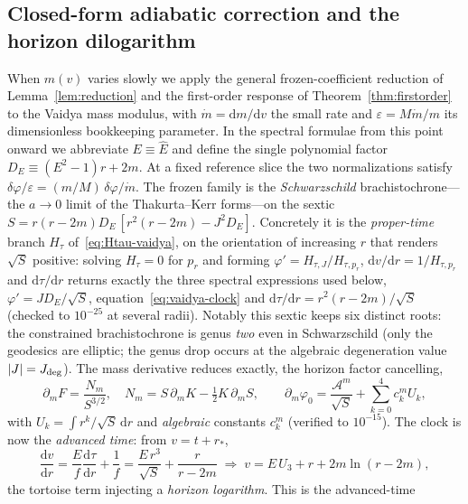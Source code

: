 \documentclass[12pt]{iopart}
\newcommand{\Ehat}{\hat E}
\newcommand{\dd}{\mathrm{d}}
\theoremstyle{plain}
\theoremstyle{definition}
\theoremstyle{plain}
\theoremstyle{remark}
\begin{document}
\subsection{Closed-form adiabatic correction and the horizon dilogarithm}
\label{sec:vaidya-adiabatic}
When $m(v)$ varies slowly we apply the general frozen-coefficient reduction of
Lemma~\ref{lem:reduction} and the first-order response of Theorem~\ref{thm:firstorder} to the Vaidya mass modulus, with
$\dot m=\dd m/\dd v$ the small rate and $\varepsilon=M\dot m/m$ its dimensionless
bookkeeping parameter. In the spectral formulae from this point onward we abbreviate
$E\equiv\Ehat$ and define the single polynomial factor
$D_E\equiv(E^2-1)r+2m$. At a fixed reference slice the two normalizations satisfy
$\delta\varphi/\varepsilon=(m/M)\,\delta\varphi/\dot m$. The frozen family
is the \emph{Schwarzschild} brachistochrone---the $a\to0$ limit of the
Thakurta--Kerr forms---on the sextic
$S=r(r-2m)D_E\,[r^2(r-2m)-J^2 D_E]$. Concretely it is the \emph{proper-time} branch
$H_\tau$ of~\eqref{eq:Htau-vaidya}, on the orientation of increasing $r$ that renders
$\sqrt S$ positive: solving $H_\tau=0$ for $p_r$ and forming
$\varphi'=H_{\tau,J}/H_{\tau,p_r}$, $\dd v/\dd r=1/H_{\tau,p_r}$ and $\dd\tau/\dd r$
returns exactly the three spectral expressions used below,
$\varphi'=J D_E/\sqrt S$, equation~\eqref{eq:vaidya-clock} and
$\dd\tau/\dd r=r^2(r-2m)/\sqrt S$ (checked to $10^{-25}$ at several radii). Notably this
sextic keeps six distinct roots: the constrained brachistochrone is genus \emph{two} even in
Schwarzschild (only the geodesics are elliptic; the genus drop occurs at the algebraic
degeneration value $|J|=J_{\rm deg}$). The mass derivative reduces exactly, the horizon factor cancelling,
\begin{equation}
    \partial_m F=\frac{N_m}{S^{3/2}},\quad N_m=S\,\partial_m K-\tfrac12 K\,\partial_m S,
    \qquad
    \partial_m\varphi_0=\frac{\mathcal{A}^m}{\sqrt S}+\sum_{k=0}^4 c_k^m U_k,
    \label{eq:dm-reduction}
\end{equation}
with $U_k=\int r^k/\sqrt S\,\dd r$ and \emph{algebraic} constants $c_k^m$ (verified
to $10^{-15}$). The clock is now the \emph{advanced time}: from $v=t+r_*$,
\begin{equation}
    \frac{\dd v}{\dd r}=\frac{E}{f}\frac{\dd\tau}{\dd r}+\frac1f
    =\frac{E\,r^3}{\sqrt S}+\frac{r}{r-2m}
    \;\Rightarrow\;
    v=E\,U_3+r+2m\ln(r-2m),
    \label{eq:vaidya-clock}
\end{equation}
the tortoise term injecting a \emph{horizon logarithm}. This is the advanced-time
\end{document}
